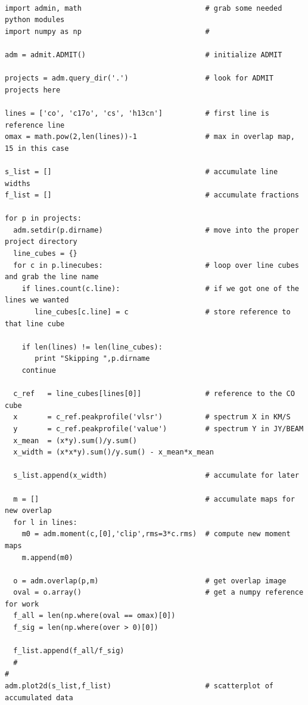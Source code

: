 \begin{verbatim}

import admin, math                             # grab some needed python modules
import numpy as np                             #

adm = admit.ADMIT()                            # initialize ADMIT

projects = adm.query_dir('.')                  # look for ADMIT projects here

lines = ['co', 'c17o', 'cs', 'h13cn']          # first line is reference line
omax = math.pow(2,len(lines))-1                # max in overlap map, 15 in this case

s_list = []                                    # accumulate line widths
f_list = []                                    # accumulate fractions

for p in projects:
  adm.setdir(p.dirname)                        # move into the proper project directory
  line_cubes = {}
  for c in p.linecubes:                        # loop over line cubes and grab the line name
    if lines.count(c.line):                    # if we got one of the lines we wanted
       line_cubes[c.line] = c                  # store reference to that line cube

    if len(lines) != len(line_cubes):
       print "Skipping ",p.dirname
    continue

  c_ref   = line_cubes[lines[0]]               # reference to the CO cube
  x       = c_ref.peakprofile('vlsr')          # spectrum X in KM/S
  y       = c_ref.peakprofile('value')         # spectrum Y in JY/BEAM
  x_mean  = (x*y).sum()/y.sum()
  x_width = (x*x*y).sum()/y.sum() - x_mean*x_mean 

  s_list.append(x_width)                       # accumulate for later

  m = []                                       # accumulate maps for new overlap
  for l in lines:                           
    m0 = adm.moment(c,[0],'clip',rms=3*c.rms)  # compute new moment maps
    m.append(m0)

  o = adm.overlap(p,m)                         # get overlap image
  oval = o.array()                             # get a numpy reference for work
  f_all = len(np.where(oval == omax)[0])       
  f_sig = len(np.where(over > 0)[0])

  f_list.append(f_all/f_sig)
  #
#
adm.plot2d(s_list,f_list)                      # scatterplot of accumulated data 
							        
\end{verbatim}
